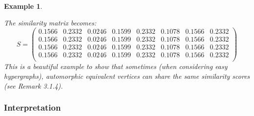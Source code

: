 \documentclass[a4paper,11pt]{report}
\newtheorem{example}[theorem]{Example}
\begin{document}
\begin{example}
\begin{center}
\begin{tikzpicture}
\end{tikzpicture}
\end{center}
The similarity matrix becomes:
$$S = \begin{pmatrix}
0.1566&0.2332&0.0246&0.1599&0.2332&0.1078&0.1566&0.2332\\
0.1566&0.2332&0.0246&0.1599&0.2332&0.1078&0.1566&0.2332\\
0.1566&0.2332&0.0246&0.1599&0.2332&0.1078&0.1566&0.2332\\
0.1566&0.2332&0.0246&0.1599&0.2332&0.1078&0.1566&0.2332\\
\end{pmatrix}$$
This is a beautiful example to show that sometimes (when considering easy hypergraphs), automorphic 
equivalent vertices can share the same similarity scores (see Remark 3.1.4).
\end{example}


\subsubsection{Interpretation}
\end{document}
